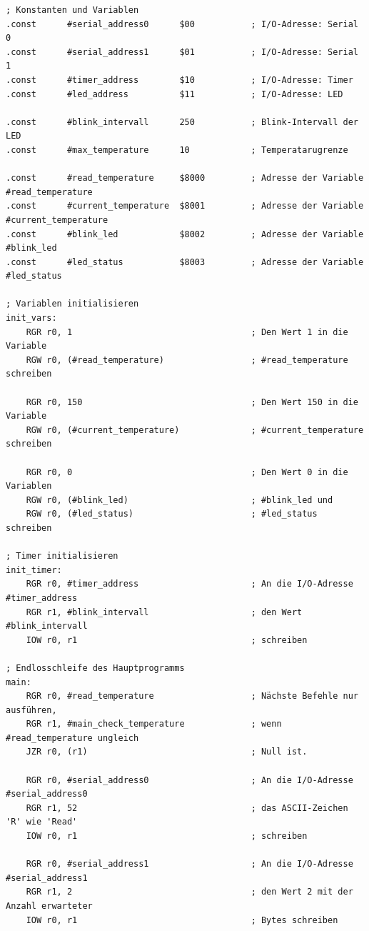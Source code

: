 {
\footnotesize

\begin{verbatim}
; Konstanten und Variablen
.const      #serial_address0      $00           ; I/O-Adresse: Serial 0
.const      #serial_address1      $01           ; I/O-Adresse: Serial 1
.const      #timer_address        $10           ; I/O-Adresse: Timer
.const      #led_address          $11           ; I/O-Adresse: LED

.const      #blink_intervall      250           ; Blink-Intervall der LED
.const      #max_temperature      10            ; Temperatarugrenze

.const      #read_temperature     $8000         ; Adresse der Variable #read_temperature
.const      #current_temperature  $8001         ; Adresse der Variable #current_temperature
.const      #blink_led            $8002         ; Adresse der Variable #blink_led
.const      #led_status           $8003         ; Adresse der Variable #led_status

; Variablen initialisieren
init_vars:
    RGR r0, 1                                   ; Den Wert 1 in die Variable
    RGW r0, (#read_temperature)                 ; #read_temperature schreiben

    RGR r0, 150                                 ; Den Wert 150 in die Variable
    RGW r0, (#current_temperature)              ; #current_temperature schreiben

    RGR r0, 0                                   ; Den Wert 0 in die Variablen
    RGW r0, (#blink_led)                        ; #blink_led und
    RGW r0, (#led_status)                       ; #led_status schreiben

; Timer initialisieren
init_timer:
    RGR r0, #timer_address                      ; An die I/O-Adresse #timer_address
    RGR r1, #blink_intervall                    ; den Wert #blink_intervall
    IOW r0, r1                                  ; schreiben

; Endlosschleife des Hauptprogramms
main:
    RGR r0, #read_temperature                   ; Nächste Befehle nur ausführen,
    RGR r1, #main_check_temperature             ; wenn #read_temperature ungleich
    JZR r0, (r1)                                ; Null ist.

    RGR r0, #serial_address0                    ; An die I/O-Adresse #serial_address0
    RGR r1, 52                                  ; das ASCII-Zeichen 'R' wie 'Read'
    IOW r0, r1                                  ; schreiben

    RGR r0, #serial_address1                    ; An die I/O-Adresse #serial_address1
    RGR r1, 2                                   ; den Wert 2 mit der Anzahl erwarteter
    IOW r0, r1                                  ; Bytes schreiben


\end{verbatim}}
